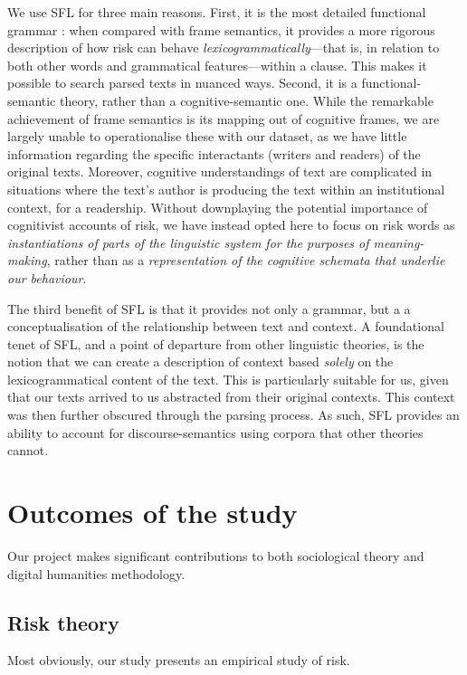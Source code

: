     We use SFL for three main reasons. First, it is the most detailed functional grammar \cite{eggins_analysing:_2004}: when compared with frame semantics, it provides a more rigorous description of how risk can behave \emph{lexicogrammatically}---that is, in relation to both other words and grammatical features---within a clause. This makes it possible to search parsed texts in nuanced ways. Second, it is a functional-semantic theory, rather than a cognitive-semantic one. While the remarkable achievement of frame semantics is its mapping out of cognitive frames, we are largely unable to operationalise these with our dataset, as we have little information regarding the specific interactants (writers and readers) of the original texts. Moreover, cognitive understandings of text are complicated in situations where the text's author is producing the text within an institutional context, for a readership. Without downplaying the potential importance of cognitivist accounts of risk, we have instead opted here to focus on risk words as \emph{instantiations of parts of the linguistic system for the purposes of meaning-making}, rather than as a \emph{representation of the cognitive schemata that underlie our behaviour}.

    The third benefit of SFL is that it provides not only a grammar, but a a conceptualisation of the relationship between text and context. A foundational tenet of SFL, and a point of departure from other linguistic theories, is the notion that we can create a description of context based \emph{solely} on the lexicogrammatical content of the text. This is particularly suitable for us, given that our texts arrived to us abstracted from their original contexts. This context was then further obscured through the parsing process. As such, SFL provides an ability to account for discourse-semantics using corpora that other theories cannot.


\section{Outcomes of the study}

Our project makes significant contributions to both sociological theory and digital humanities methodology.

\subsection{Risk theory}

Most obviously, our study presents an empirical study of risk.

